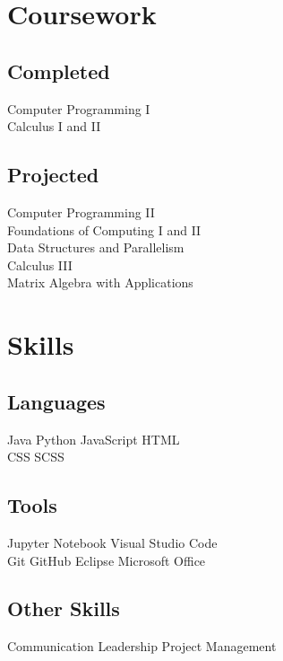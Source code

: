 \documentclass[]{deedy-resume}
\begin{document}
\begin{minipage}[t]{0.33\textwidth}

\section{Coursework}

\subsection{Completed}
Computer Programming I \\
Calculus I and II \\
\sectionsep

\subsection{Projected}
Computer Programming II \\
Foundations of Computing I and II \\
Data Structures and Parallelism \\
Calculus III \\
Matrix Algebra with Applications \\


\section{Skills}

\subsection{Languages}
Java \textbullet{} Python \textbullet{} JavaScript \textbullet{} HTML \\
CSS \textbullet{} SCSS
\sectionsep

\subsection{Tools}
Jupyter Notebook \textbullet{} Visual Studio Code \\
Git \textbullet{} GitHub \textbullet{} Eclipse \textbullet{} Microsoft Office
\sectionsep

\subsection{Other Skills}
Communication \textbullet{} Leadership \textbullet{} Project Management
\sectionsep


\end{minipage}
\end{document}
